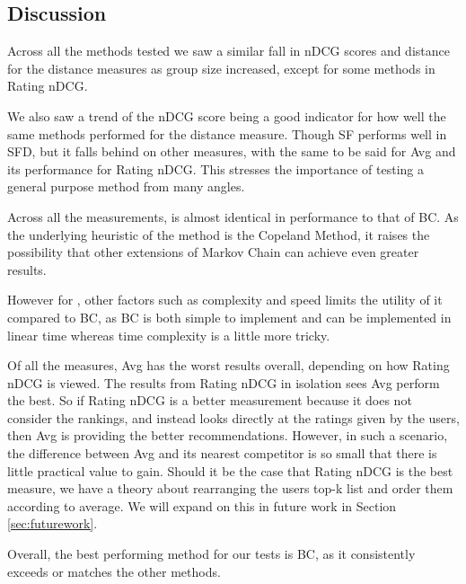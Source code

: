 \subsection{Discussion} \label{sec:discussion}

Across all the methods tested we saw a similar fall in nDCG scores and distance for the distance measures as group size increased, except for some methods in Rating nDCG.

We also saw a trend of the nDCG score being a good indicator for how well the same  methods performed for the distance measure. Though SF performs well in SFD, but it falls behind on other measures, with the same to be said for Avg and its performance for Rating nDCG. This stresses the importance of testing a general purpose method from many angles.

Across all the measurements, \MC is almost identical in performance to that of BC. As the underlying heuristic of the \MC method is the Copeland Method, it raises the possibility that other extensions of Markov Chain can achieve even greater results.

However for \MC, other factors such as complexity and speed limits the utility of it compared to BC, as BC is both simple to implement and can be implemented in linear time whereas \MC time complexity is a little more tricky\citep{rank:aggregation}.

Of all the measures, Avg has the worst results overall, depending on how Rating nDCG is viewed. The results from Rating nDCG in isolation sees Avg perform the best. So if Rating nDCG is a better measurement because it does not consider the rankings, and instead looks directly at the ratings given by the users, then Avg is providing the better recommendations. However, in such a scenario, the difference between Avg and its nearest competitor is so small that there is little practical value to gain. Should it be the case that Rating nDCG is the best measure, we have a theory about rearranging the users top-k list and order them according to average. We will expand on this in future work in Section \ref{sec:futurework}.

Overall, the best performing method for our tests is BC, as it consistently exceeds or matches the other methods.



